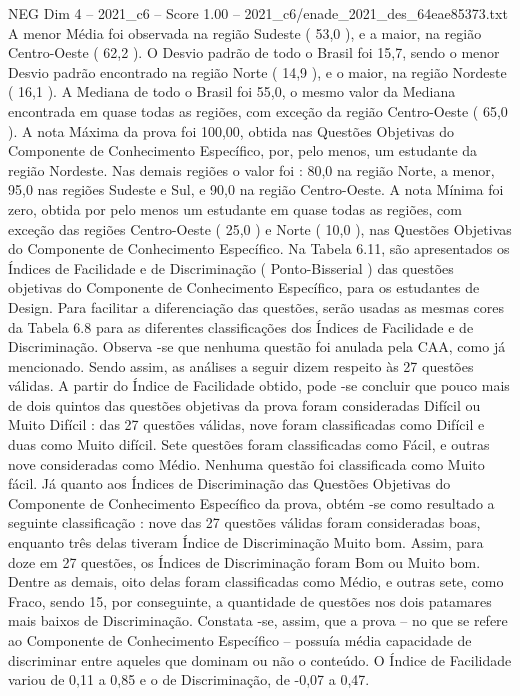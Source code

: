 \begin{textsample}{NEG Dim 4 – 2021\_c6 – Score 1.00 – 2021\_c6/enade\_2021\_des\_64eae85373.txt}
A menor Média foi observada na região Sudeste ( 53,0 ), e a maior, na região Centro-Oeste ( 62,2 ).
O Desvio padrão de todo o Brasil foi 15,7, sendo o menor Desvio padrão encontrado na região Norte ( 14,9 ), e o maior, na região Nordeste ( 16,1 ).
A Mediana de todo o Brasil foi 55,0, o mesmo valor da Mediana encontrada em quase todas as regiões, com exceção da região Centro-Oeste ( 65,0 ).
A nota Máxima da prova foi 100,00, obtida nas Questões Objetivas do Componente de Conhecimento Específico, por, pelo menos, um estudante da região Nordeste.
Nas demais regiões o valor foi : 80,0 na região Norte, a menor, 95,0 nas regiões Sudeste e Sul, e 90,0 na região Centro-Oeste.
A nota Mínima foi zero, obtida por pelo menos um estudante em quase todas as regiões, com exceção das regiões Centro-Oeste ( 25,0 ) e Norte ( 10,0 ), nas Questões Objetivas do Componente de Conhecimento Específico.
Na Tabela 6.11, são apresentados os Índices de Facilidade e de Discriminação ( Ponto-Bisserial ) das questões objetivas do Componente de Conhecimento Específico, para os estudantes de Design.
Para facilitar a diferenciação das questões, serão usadas as mesmas cores da Tabela 6.8 para as diferentes classificações dos Índices de Facilidade e de Discriminação.
Observa -se que nenhuma questão foi anulada pela CAA, como já mencionado.
Sendo assim, as análises a seguir dizem respeito às 27 questões válidas.
A partir do Índice de Facilidade obtido, pode -se concluir que pouco mais de dois quintos das questões objetivas da prova foram consideradas Difícil ou Muito Difícil : das 27 questões válidas, nove foram classificadas como Difícil e duas como Muito difícil.
Sete questões foram classificadas como Fácil, e outras nove consideradas como Médio.
Nenhuma questão foi classificada como Muito fácil.
Já quanto aos Índices de Discriminação das Questões Objetivas do Componente de Conhecimento Específico da prova, obtém -se como resultado a seguinte classificação : nove das 27 questões válidas foram consideradas boas, enquanto três delas tiveram Índice de Discriminação Muito bom.
Assim, para doze em 27 questões, os Índices de Discriminação foram Bom ou Muito bom.
Dentre as demais, oito delas foram classificadas como Médio, e outras sete, como Fraco, sendo 15, por conseguinte, a quantidade de questões nos dois patamares mais baixos de Discriminação.
Constata -se, assim, que a prova – no que se refere ao Componente de Conhecimento Específico – possuía média capacidade de discriminar entre aqueles que dominam ou não o conteúdo.
O Índice de Facilidade variou de 0,11 a 0,85 e o de Discriminação, de -0,07 a 0,47.

\end{textsample}
